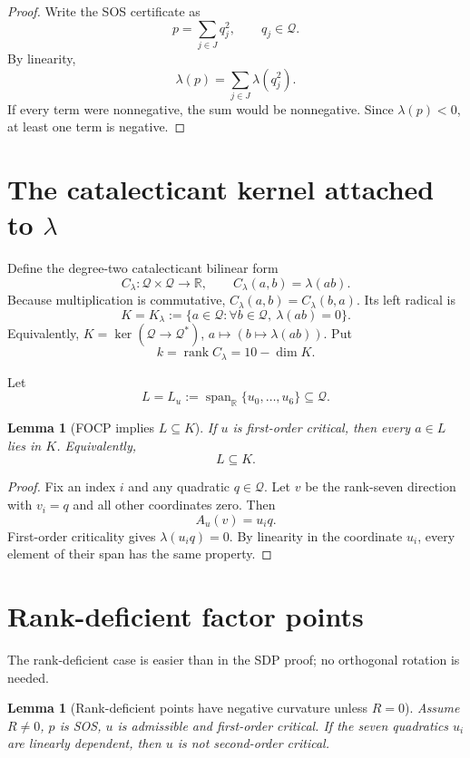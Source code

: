 \documentclass[11pt]{article}
\newtheorem{lemma}[theorem]{Lemma}
\newcommand{\R}{\mathbb R}
\newcommand{\Quad}{\mathcal Q}
\newcommand{\Span}{\operatorname{span}}
\newcommand{\rank}{\operatorname{rank}}
\newcommand{\defeq}{\mathrel{:=}}
\begin{document}
\begin{proof}
Write the SOS certificate as
\[
p=\sum_{j\in J} q_j^2,
\qquad q_j\in\Quad.
\]
By linearity,
\[
\lambda(p)=\sum_{j\in J}\lambda(q_j^2).
\]
If every term were nonnegative, the sum would be nonnegative.  Since \(\lambda(p)<0\), at least one term is negative.
\end{proof}

\section{The catalecticant kernel attached to \(\lambda\)}

Define the degree-two catalecticant bilinear form
\[
C_\lambda:\Quad\times\Quad\to\R,
\qquad
C_\lambda(a,b)=\lambda(ab).
\]
Because multiplication is commutative, \(C_\lambda(a,b)=C_\lambda(b,a)\).  Its left radical is
\[
K=K_\lambda
\defeq
\{a\in\Quad: \forall b\in\Quad,\ \lambda(ab)=0\}.
\]
Equivalently, \(K=\ker(\Quad\to\Quad^*)\), \(a\mapsto(b\mapsto\lambda(ab))\).  Put
\[
k=\rank C_\lambda=10-\dim K.
\]

Let
\[
L=L_u\defeq \Span_\R\{u_0,\dots,u_6\}\subseteq\Quad.
\]

\begin{lemma}[FOCP implies \(L\subseteq K\)]\label{lem:L-subset-K}
If \(u\) is first-order critical, then every \(a\in L\) lies in \(K\).  Equivalently,
\[
L\subseteq K.
\]
\end{lemma}

\begin{proof}
Fix an index \(i\) and any quadratic \(q\in\Quad\).  Let \(v\) be the rank-seven direction with \(v_i=q\) and all other coordinates zero.  Then
\[
A_u(v)=u_iq.
\]
First-order criticality gives \(\lambda(u_iq)=0\).  By linearity in the coordinate \(u_i\), every element of their span has the same property.
\end{proof}

\section{Rank-deficient factor points}

The rank-deficient case is easier than in the SDP proof; no orthogonal rotation is needed.

\begin{lemma}[Rank-deficient points have negative curvature unless \(R=0\)]\label{lem:rank-deficient}
Assume \(R\ne0\), \(p\) is SOS, \(u\) is admissible and first-order critical.  If the seven quadratics \(u_i\) are linearly dependent, then \(u\) is not second-order critical.
\end{lemma}
\end{document}
